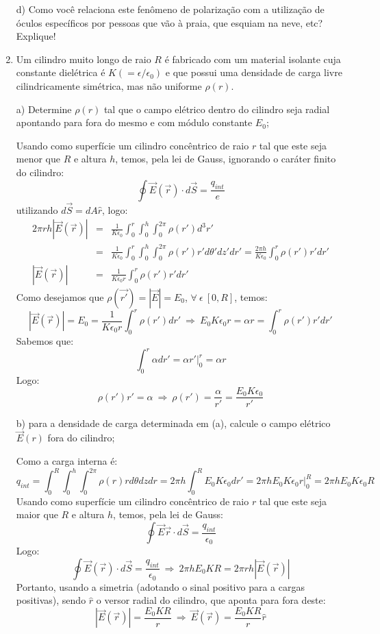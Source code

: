 \begin{enumerate}[start=1,label={\bfseries Q\arabic*.}]
\resposta

d) Como você relaciona este fenômeno de polarização com a utilização de óculos específicos por pessoas que vão à praia, que esquiam na neve, etc? Explique!

\resposta


\item Um cilindro muito longo de raio $R$ é fabricado com um material isolante cuja constante dielétrica é $K (= \epsilon / \epsilon_{0})$ e que possui uma densidade de carga livre cilindricamente simétrica, mas não uniforme $\rho(r)$.

a) Determine $\rho(r)$ tal que o campo elétrico dentro do cilindro seja radial apontando para fora do mesmo e com módulo constante $E_{0}$;

\resposta Usando como superfície um cilindro concêntrico de raio $r$ tal que este seja menor que $R$ e altura $h$, temos, pela lei de Gauss, ignorando o caráter finito do cilindro:
$$
\oint \vec{E} (\vec{r}) \cdot d \vec{S} = \frac{q_{int}}{e}
$$
utilizando $d\vec{S} = d A \hat{r}$, logo:
$$
\begin{array}{ccl}
  2 \pi r h |\vec{E}(\vec{r})| & = & \frac{1}{K \epsilon_{0}} \int_{0}^{r} \int_{0}^{h} \int_{0}^{2\pi} \rho (r') d^{3} r' \\
  & = & \frac{1}{K \epsilon_{0}} \int_{0}^{r} \int_{0}^{h} \int_{0}^{2\pi} \rho (r') r' d \theta' d z' d r' = \frac{2\pi h}{K \epsilon_{0}} \int_{0}^{r} \rho (r')r' d r' \\
  |\vec{E}(\vec{r})|  & = & \frac{1}{K \epsilon_{0} r} \int_{0}^{r} \rho(r') r' d r'
\end{array}
$$
Como desejamos que $\rho (\vec{r'}) = |\vec{E}| = E_{0}$, $\forall \ \epsilon \ [0, R]$, temos:
$$
|\vec{E}(\vec{r})| = E_{0} = \frac{1}{K \epsilon_{0} r} \int_{0}^{r} \rho (r') dr' \ \Rightarrow \ E_{0} K \epsilon_{0} r = \alpha r = \int_{0}^{r} \rho (r') r' dr'
$$
Sabemos que:
$$
\int_{0}^{r} \alpha d r' = \left. \alpha r' \right|_{0}^{r} = \alpha r
$$
Logo:
$$
 \rho (r') r' = \alpha \ \Rightarrow \ \rho (r') = \frac{\alpha}{r'} = \frac{E_{0} K \epsilon_{0}}{r'}
$$


b) para a densidade de carga determinada em (a), calcule o campo elétrico $\vec{E}(r)$ fora do cilindro;

\resposta Como a carga interna é:
$$
q_{int} = \int_{0}^{R} \int_{0}^{h} \int_{0}^{2\pi} \rho (r) r d \theta d z d r = 2 \pi h \int_{0}^{R} E_{0} K \epsilon_{0} d r' = \left.  2 \pi h E_{0} K \epsilon_{0} r \right|_{0}^{R} = 2 \pi h E_{0} K \epsilon_{0} R
$$
Usando como superfície um cilindro concêntrico de raio $r$ tal que este seja maior que $R$ e altura $h$, temos, pela lei de Gauss:
$$
\oint \vec{E} \vec{r} \cdot d \vec{S} = \frac{q_{int}}{\epsilon_{0}}
$$
Logo:
$$
\oint \vec{E} (\vec{r}) \cdot d \vec{S} = \frac{q_{int}}{\epsilon_{0}} \ \Rightarrow \ 2\pi h E_{0} K R = 2 \pi r h |\vec{E}(\vec{r})|
$$
Portanto, usando a simetria (adotando o sinal positivo  para a cargas positivas), sendo $\hat{r}$ o versor radial do cilindro, que aponta para fora deste:
$$
|\vec{E}(\vec{r})| = \frac{E_{0} K R}{r} \ \Rightarrow \ \vec{E}(\vec{r}) = \frac{E_{0} K R}{r} \hat{r}
$$




\end{enumerate}
